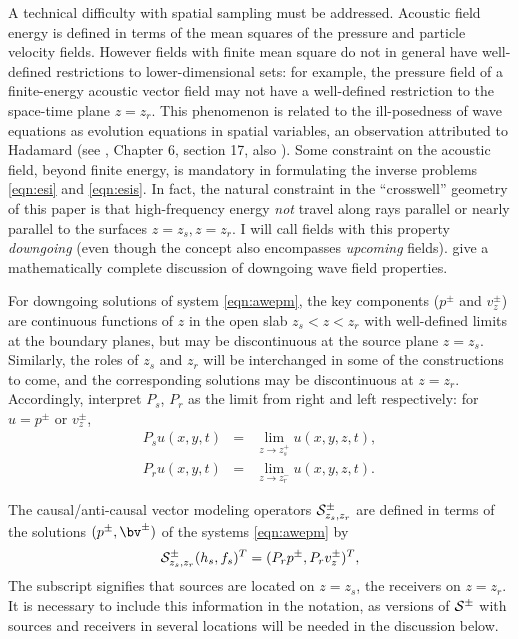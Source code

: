 A technical difficulty with spatial sampling must be
addressed. Acoustic field energy is defined in terms of the mean
squares of the pressure and particle velocity fields. However fields
with finite mean square do not in general have well-defined
restrictions to lower-dimensional sets: for example, the pressure
field of a finite-energy acoustic vector field may not have a
well-defined restriction to the space-time plane $z=z_r$. This
phenomenon is related to the ill-posedness of wave equations as
evolution equations in spatial variables, an observation attributed to
Hadamard (see \cite{CourHil:62}, Chapter 6, section 17, also
\cite{Payn:75,Symes:83}). Some constraint on the acoustic field,
beyond finite energy, is mandatory in formulating the inverse problems
\ref{eqn:esi} and \ref{eqn:esis}. In fact, the natural constraint in
the ``crosswell'' geometry of this paper is that high-frequency energy
{\em not} travel along rays parallel or nearly parallel to the
surfaces $z=z_s, z=z_r$. I will call fields with this property {\em
  downgoing} (even though the concept also encompasses {\em upcoming}
fields). \cite{BaoSy:91b} give a mathematically complete discussion of
downgoing wave field properties.

For downgoing solutions of system \ref{eqn:awepm}, the key
components ($p^{\pm}$ and $v^{\pm}_z$) are continuous functions of $z$
in the open slab $z_s<z<z_r$ with well-defined limits at the boundary
planes, but may be discontinuous at the source plane
$z=z_s$. Similarly, the roles of $z_s$ and $z_r$ will be interchanged
in some of the constructions to come, and the corresponding solutions
may be discontinuous at $z=z_r$. Accordingly, interpret $P_s$, $P_r$
as the limit from right and left respectively: for $u=p^{\pm}$ or
$v^{\pm}_z$,
\begin{eqnarray}
  \label{eqn:defsamp}
  P_su(x,y,t) &=& \lim_{z \rightarrow z_s^+} u(x,y,z,t),\nonumber \\
  P_ru(x,y,t) &=& \lim_{z \rightarrow z_r^-} u(x,y,z,t).                  
\end{eqnarray}


The causal/anti-causal vector
modeling operators ${\cal S}^{\pm}_{z_s,z_r}$ are defined in terms of
the solutions $(p^{\pm},\bv^{\pm})$ of the systems \ref{eqn:awepm} by
\begin{equation}
  {\cal S}^{\pm}_{z_s,z_r}(h_s,f_s)^T  = (P_rp^{\pm},P_r v_z^{\pm})^T,
  \label{eqn:fwd}
\end{equation}
The subscript signifies that sources are located on $z=z_s$, the
receivers on $z=z_r$. It is necessary to include this information in
the notation, as versions of ${\cal S}^{\pm}$ with sources and receivers in
several locations will be needed in the discussion below.

